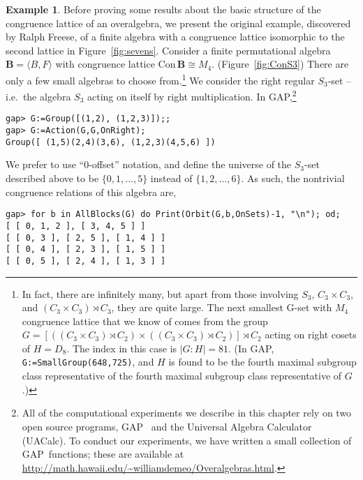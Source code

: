 \documentclass[cm,dissertation,actual,final]{uhthesis}
\theoremstyle{plain}
\theoremstyle{definition}
\newtheorem{example}[theorem]{Example}
\theoremstyle{remark}
\numberwithin{theorem}{section}
\numberwithin{claim}{chapter}
\numberwithin{equation}{section}
\numberwithin{conjecture}{chapter}
\newcommand{\<}{\ensuremath{\langle}}
\renewcommand{\>}{\ensuremath{\rangle}}
\newcommand{\Con}{\ensuremath{\mathrm{Con\,}}}
\newcommand{\GAP}{\textsf{GAP}}
\newcommand{\uacalc}{\textsf{UACalc}}
\newcommand{\0}{\ensuremath{\mathbf{0}}}
\newcommand{\1}{\ensuremath{\mathbf{1}}}
\newcommand{\2}{\ensuremath{\mathbf{2}}}
\newcommand{\3}{\ensuremath{\mathbf{3}}}
\newcommand{\4}{\ensuremath{\mathbf{4}}}
\newcommand{\5}{\ensuremath{\mathbf{5}}}
\newcommand{\bB}{\ensuremath{\mathbf{B}}}
\begin{document}
\begin{example}
  \label{ex:3.1}  
  Before proving some results about the basic structure of the
  congruence lattice of an overalgebra, we 
  present the original example, discovered by 
%
Ralph Freese, of a finite algebra with
  a congruence lattice isomorphic to the second lattice in 
  Figure~\ref{fig:sevens}.
  Consider a finite permutational algebra $\bB = \<B, F\>$
  with congruence lattice $\Con\bB \cong M_4$. (Figure~\ref{fig:ConS3})
  There are only a few small algebras to choose 
  from.\footnote{In fact, there are
    infinitely many, but apart from those involving 
    $S_3$, $C_3 \times C_3$, and $(C_3 \times C_3) \rtimes C_3$, they are quite
    large.  The next smallest G-set with $M_4$
    congruence lattice that we know of comes from the group 
    $G = 
    [ 
      ( (C_3 \times C_3) \rtimes C_2 ) 
      \times 
      ( (C_3 \times C_3) \rtimes C_2 )
    ] \rtimes C_2$
    acting on right cosets of $H = D_8$.  
    The index in this case is $|G:H| = 81$.
    (In \GAP, {\tt G:=SmallGroup(648,725)}, 
    and $H$ is 
    found to be the fourth maximal subgroup class representative 
    of the fourth maximal subgroup class representative of $G$.)}
  We consider the right regular $S_3$-set -- i.e.~the algebra $S_3$ acting on
  itself by right multiplication.  In \GAP,\footnote{
    All of the computational experiments we describe in this chapter rely on
    two open source programs, \GAP~\cite{GAP4} and the Universal Algebra
    Calculator~\cite{uacalc} (\uacalc).  To conduct our experiments,
    we have written a small collection of \GAP\ functions; these are
    available at \url{http://math.hawaii.edu/~williamdemeo/Overalgebras.html}.
  }
  
  {\footnotesize
\begin{verbatim}
gap> G:=Group([(1,2), (1,2,3)]);; 
gap> G:=Action(G,G,OnRight);  
Group([ (1,5)(2,4)(3,6), (1,2,3)(4,5,6) ])
\end{verbatim}
  }

  We prefer to use ``0-offset'' notation, and 
  define the universe of the $S_3$-set described above to be $\{0, 1,\dots,
  5\}$ instead of $\{1, 2, \dots, 6\}$.  
  As such, the nontrivial congruence relations of this algebra are,

  {\footnotesize
\begin{verbatim}
gap> for b in AllBlocks(G) do Print(Orbit(G,b,OnSets)-1, "\n"); od;
[ [ 0, 1, 2 ], [ 3, 4, 5 ] ]
[ [ 0, 3 ], [ 2, 5 ], [ 1, 4 ] ]
[ [ 0, 4 ], [ 2, 3 ], [ 1, 5 ] ]
[ [ 0, 5 ], [ 2, 4 ], [ 1, 3 ] ]
\end{verbatim}
  }


\end{example}
\end{document}
